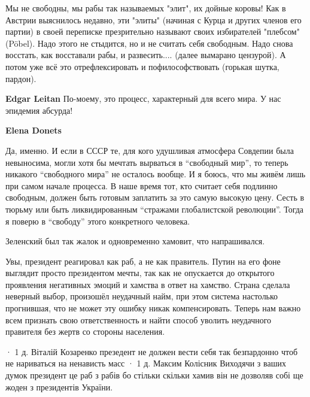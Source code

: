 \begin{itemize}
\begin{itemize}
Мы не свободны, мы рабы так называемых "элит", их дойные коровы! Как в Австрии
выяснилось недавно, эти "элиты" (начиная с Курца и других членов его партии) в
своей переписке презрительно называют своих избирателей "плебсом" (Pöbel). Надо
этого не стыдится, но и не считать себя свободным. Надо снова восстать, как
восставали рабы, и развесить.... (далее вымарано цензурой). А потом уже всё это
отрефлексировать и пофилософствовать (горькая шутка, пардон).


\textbf{Edgar Leitan} По-моему, это процесс, характерный для всего мира. У нас эпидемия абсурда!

\textbf{Elena Donets} 

Да, именно. И если в СССР те, для кого удушливая атмосфера Совдепии была
невыносима, могли хотя бы мечтать вырваться в \enquote{свободный мир}, то теперь
никакого \enquote{свободного мира} не осталось вообще. И я боюсь, что мы живём лишь при
самом начале процесса. В наше время тот, кто считает себя подлинно свободным,
должен быть готовым заплатить за это самую высокую цену. Сесть в тюрьму или
быть ликвидированным \enquote{стражами глобалистской революции}. Тогда я поверю в
\enquote{свободу} этого конкретного человека.

\end{itemize} %

Зеленский был так жалок и одновременно хамовит, что напрашивался.


Увы, президент реагировал как раб, а не как правитель. Путин на его фоне
выглядит просто президентом мечты, так как не опускается до открытого
проявления негативных эмоций и хамства в ответ на хамство. Страна сделала
неверный выбор, произошёл неудачный найм, при этом система настолько
прогнившая, что не может эту ошибку никак компенсировать. Теперь нам важно всем
признать свою ответственность и найти способ уволить неудачного правителя без
жертв со стороны населения.

 · 1 д.
Віталій Козаренко
презедент не должен вести себя так безпардонно чтоб не нариваться на ненависть масс
 · 1 д.
Максим Колісник
Виходячи з ваших думок президент це раб з рабів бо стільки скільки хамив він не дозволяв собі ще жоден з президентів України.


\end{itemize} %
